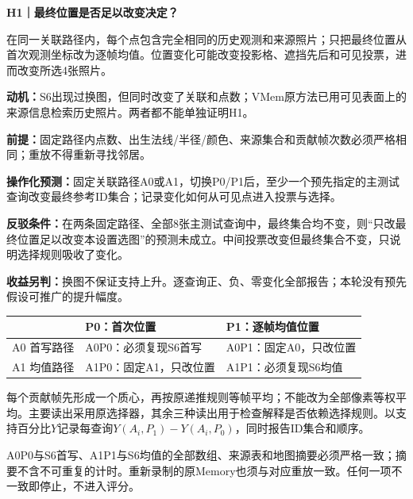 \documentclass[11pt,a4paper,fontset=none]{ctexart}
\newcommand{\smallhead}[1]{\vspace{4pt}{\large\bfseries\color{hypothesis1}#1}\par}
\begin{document}
\newpage
{\LARGE\bfseries\color{hypothesis1}H1｜最终位置是否足以改变决定？}\par
\begin{hypothesisbox1}[解释与成立前提]
在同一关联路径内，每个点包含完全相同的历史观测和来源照片；只把最终位置从首次观测坐标改为逐帧均值。位置变化可能改变投影格、遮挡先后和可见投票，进而改变所选4张照片。

\textbf{动机：}S6出现过换图，但同时改变了关联和点数；VMem原方法已用可见表面上的来源信息检索历史照片。两者都不能单独证明H1。\citep{vmem}

\textbf{前提：}固定路径内点数、出生法线/半径/颜色、来源集合和贡献帧次数必须严格相同；重放不得重新寻找邻居。
\end{hypothesisbox1}

\begin{predictionbox}[预测与可反驳条件]
\textbf{操作化预测：}固定关联路径A0或A1，切换P0/P1后，至少一个预先指定的主测试查询改变最终参考ID集合；记录变化如何从可见点进入投票与选择。

\textbf{反驳条件：}在两条固定路径、全部8张主测试查询中，最终集合均不变，则“只改最终位置足以改变本设置选图”的预测未成立。中间投票改变但最终集合不变，只说明选择规则吸收了变化。

\textbf{收益另判：}换图不保证支持上升。逐查询正、负、零变化全部报告；本轮没有预先假设可推广的提升幅度。
\end{predictionbox}

\smallhead{设计：两条固定路径内分别比较}
\begin{tabularx}{\linewidth}{@{}p{23mm}XX@{}}
\toprule
 & \textbf{P0：首次位置} & \textbf{P1：逐帧均值位置}\\
\midrule
A0 首写路径 & A0P0：必须复现S6首写 & A0P1：固定A0，只改位置\\
A1 均值路径 & A1P0：固定A1，只改位置 & A1P1：必须复现S6均值\\
\bottomrule
\end{tabularx}

每个贡献帧先形成一个质心，再按原递推规则等帧平均；不能改为全部像素等权平均。主要读出采用原选择器，其余三种读出用于检查解释是否依赖选择规则。以支持百分比$Y$记录每查询$Y(A_i,P_1)-Y(A_i,P_0)$，同时报告ID集合和顺序。

\begin{comparisonbox}
A0P0与S6首写、A1P1与S6均值的全部数组、来源表和地图摘要必须严格一致；摘要不含不可重复的计时。重新录制的原Memory也须与对应重放一致。任何一项不一致即停止，不进入评分。
\end{comparisonbox}
\end{document}
